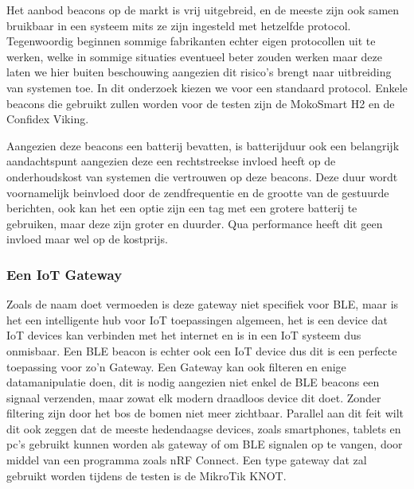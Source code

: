 Het aanbod beacons op de markt is vrij uitgebreid, en de meeste zijn ook samen bruikbaar in een systeem mits ze zijn ingesteld met hetzelfde protocol. Tegenwoordig beginnen sommige fabrikanten echter eigen protocollen uit te werken, welke in sommige situaties eventueel beter zouden werken maar deze laten we hier buiten beschouwing aangezien dit risico's brengt naar uitbreiding van systemen toe. In dit onderzoek kiezen we voor een standaard protocol. Enkele beacons die gebruikt zullen worden voor de testen zijn de MokoSmart H2 en de Confidex Viking.

Aangezien deze beacons een batterij bevatten, is batterijduur ook een belangrijk aandachtspunt aangezien deze een rechtstreekse invloed heeft op de onderhoudskost van systemen die vertrouwen op deze beacons. Deze duur wordt voornamelijk beinvloed door de zendfrequentie en de grootte van de gestuurde berichten, ook kan het een optie zijn een tag met een grotere batterij te gebruiken, maar deze zijn groter en duurder. Qua performance heeft dit geen invloed maar wel op de kostprijs. 

\subsubsection{Een IoT Gateway}
Zoals de naam doet vermoeden is deze gateway niet specifiek voor BLE, maar is het een intelligente hub voor IoT toepassingen algemeen, het is een device dat IoT devices kan verbinden met het internet en is in een IoT systeem dus onmisbaar. Een BLE beacon is echter ook een IoT device dus dit is een perfecte toepassing voor zo'n Gateway.\autocite{MultiTech2022} Een Gateway kan ook filteren en enige datamanipulatie doen, dit is nodig aangezien niet enkel de BLE beacons een signaal verzenden, maar zowat elk modern draadloos device dit doet. Zonder filtering zijn door het bos de bomen niet meer zichtbaar. Parallel aan dit feit wilt dit ook zeggen dat de meeste hedendaagse devices, zoals smartphones, tablets en pc's gebruikt kunnen worden als gateway of om BLE signalen op te vangen, door middel van een programma zoals nRF Connect.\autocite{Semiconductor2022} Een type gateway dat zal gebruikt worden tijdens de testen is de MikroTik KNOT.

